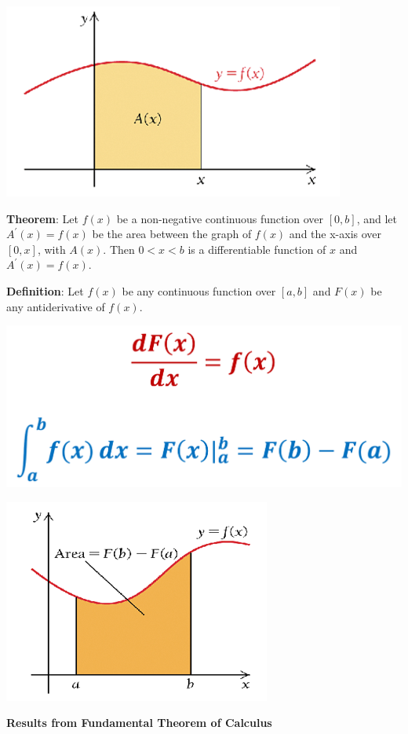 \documentclass[
]{book}
\begin{document}
\begin{center}\includegraphics[width=0.45\linewidth]{img12/areaFunction} \end{center}

\textbf{Theorem}: Let \(f(x)\) be a non-negative continuous function over \([0, b]\), and let \(A^\prime(x) = f(x)\) be the area between the graph of \(f(x)\) and the x-axis over \([0, x]\), with \(A(x)\). Then \(0 < x < b\) is a differentiable function of \(x\) and \(A^\prime(x) = f(x)\).

\hfill\break

\textbf{Definition}: Let \(f(x)\) be any continuous function over \([a, b]\) and \(F(x)\) be any antiderivative of \(f(x)\).

\begin{center}\includegraphics[width=0.75\linewidth]{img12/fundamentalThmCalculus} \end{center}

\begin{center}\includegraphics[width=0.45\linewidth]{img12/fundamentalTheorem} \end{center}

\hfill\break

\textbf{Results from Fundamental Theorem of Calculus}
\end{document}
